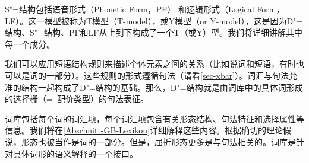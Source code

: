 S"=结构包括语音形式（Phonetic Form，PF） 和逻辑形式（Logical Form，LF）。这一模型被称为T模型（T-model），或Y模型（or Y-model），这是因为D"=结构、S"=结构、PF和LF从上到下构成了一个T（或Y）型。我们将详细讲解其中每一个成分。

我们可以应用短语结构规则来描述个体元素之间的关系（比如说词和短语，有时也可以是词的一部分）。这些规则的形式遵循\xbarc 句法（请看\ref{sec-xbar}）。词汇与\xbarc 句法允准的结构一起构成了D"=结构的基础。那么，D"=结构就是由词库中的具体词形成的选择栅（=~配价类型）的句法表征。

词库包括每个词的词汇项，每个词汇项包含有关形态结构、句法特征和选择属性等信息。我们将在\ref{Abschnitt-GB-Lexikon}详细解释这些内容。根据确切的理论假说，形态也被当作是词的一部分。但是，屈折形态更多是与句法相关的。词库是针对具体词形的语义解释的一个接口。

